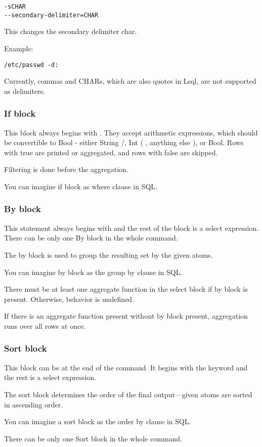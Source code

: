 \begin{verbatim}
-sCHAR
--secondary-delimiter=CHAR
\end{verbatim}
This changes the secondary delimiter char.

Example:
\begin{verbatim}
/etc/passwd -d:
\end{verbatim}

Currently, commas and CHARs, which are also quotes in Lsql, are not supported as delimiters.

\subsubsection{If block}
This block always begins with . They accept arithmetic expressions, which should be convertible to Bool - either String /, Int ( , anything else ), or Bool. 
Rows with true are printed or aggregated, and rows with false are skipped.

Filtering is done before the aggregation.

You can imagine if block as where clause in SQL.

\subsubsection{By block}
This statement always begins with  and the rest of the block is a select expression. There can be only one By block in the whole command.

The by block is used to group the resulting set by the given atoms.

You can imagine by block as the group by clause in SQL. 

There must be at least one aggregate function in the select block if by block is present. Otherwise, behavior is undefined.

If there is an aggregate function present without by block present, aggregation runs over all rows at once.

\subsubsection{Sort block}
This block can be at the end of the command. It begins with the  keyword and the rest is a select expression.

The sort block determines the order of the final output---given atoms are sorted in ascending order.

You can imagine a sort block as the order by clause in SQL.

There can be only one Sort block in the whole command.

